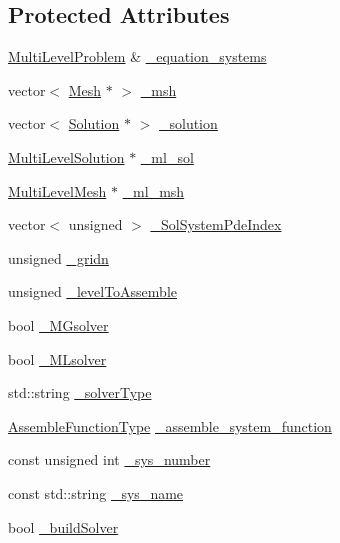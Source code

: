 \subsection*{Protected Attributes}
\begin{DoxyCompactItemize}
\item 
\mbox{\hyperlink{classfemus_1_1_multi_level_problem}{Multi\+Level\+Problem}} \& \mbox{\hyperlink{classfemus_1_1_system_a7d1765e86f703f5a4ae3944d945215b6}{\+\_\+equation\+\_\+systems}}
\item 
vector$<$ \mbox{\hyperlink{classfemus_1_1_mesh}{Mesh}} $\ast$ $>$ \mbox{\hyperlink{classfemus_1_1_system_ab45d7c55f2f903a2839104131d2eb572}{\+\_\+msh}}
\item 
vector$<$ \mbox{\hyperlink{classfemus_1_1_solution}{Solution}} $\ast$ $>$ \mbox{\hyperlink{classfemus_1_1_system_af2fc403002e82633ab3b100ca3fefa47}{\+\_\+solution}}
\item 
\mbox{\hyperlink{classfemus_1_1_multi_level_solution}{Multi\+Level\+Solution}} $\ast$ \mbox{\hyperlink{classfemus_1_1_system_a6e000f17ac05a0938a4a8e7b72c957de}{\+\_\+ml\+\_\+sol}}
\item 
\mbox{\hyperlink{classfemus_1_1_multi_level_mesh}{Multi\+Level\+Mesh}} $\ast$ \mbox{\hyperlink{classfemus_1_1_system_a3be539b0e20b909f55520c58e4e16843}{\+\_\+ml\+\_\+msh}}
\item 
vector$<$ unsigned $>$ \mbox{\hyperlink{classfemus_1_1_system_a8d0dc8efe0a0144c7da0b2d848986e78}{\+\_\+\+Sol\+System\+Pde\+Index}}
\item 
unsigned \mbox{\hyperlink{classfemus_1_1_system_ae1ee15b9d70bb8e118366c37ebc75f8a}{\+\_\+gridn}}
\item 
unsigned \mbox{\hyperlink{classfemus_1_1_system_a4fcefeeec2a9777f362e1b25c04d40e9}{\+\_\+level\+To\+Assemble}}
\item 
bool \mbox{\hyperlink{classfemus_1_1_system_aa4702804d2490808f6e0525a081c2bf5}{\+\_\+\+M\+Gsolver}}
\item 
bool \mbox{\hyperlink{classfemus_1_1_system_a2a519fbc814e32e10dd2d01c7695c092}{\+\_\+\+M\+Lsolver}}
\item 
std\+::string \mbox{\hyperlink{classfemus_1_1_system_af26639b99612eb2307723359124e32cd}{\+\_\+solver\+Type}}
\item 
\mbox{\hyperlink{classfemus_1_1_system_ae71fa78abbc4b3efe8ef1dc057275b9b}{Assemble\+Function\+Type}} \mbox{\hyperlink{classfemus_1_1_system_a712ef55df0fc3bacbf358036be3e10eb}{\+\_\+assemble\+\_\+system\+\_\+function}}
\item 
const unsigned int \mbox{\hyperlink{classfemus_1_1_system_ae24afc2eadae2253268bc9442f2a02e3}{\+\_\+sys\+\_\+number}}
\item 
const std\+::string \mbox{\hyperlink{classfemus_1_1_system_a1179f082cb14d4f3c82c699bbbb0f870}{\+\_\+sys\+\_\+name}}
\item 
bool \mbox{\hyperlink{classfemus_1_1_system_ac137ab0e8e2e10f20633509bf03bbde6}{\+\_\+build\+Solver}}
\end{DoxyCompactItemize}


